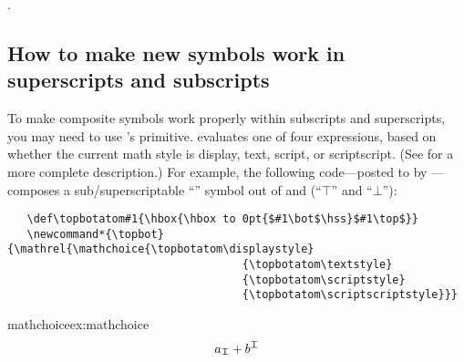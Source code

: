 \ifhavecenternot
\else
  .
\fi   
{}


\subsection{How to make new symbols work in superscripts and subscripts}



To make composite symbols work properly within subscripts and
superscripts, you may need to use \tex's \cmd{\mathchoice} primitive.
\cmd{\mathchoice} evaluates one of four expressions, based on whether
the current math style is display, text, script, or scriptscript.
(See \TeXbook for a more complete description.)  For example, the
following \latex code---posted to \ctt by
---composes a sub/superscriptable
``\cmd{\topbot}'' symbol out of  and  (``$\top$''
and ``$\bot$''):



\indexcommand{\displaystyle}%
\indexcommand{\textstyle}%
\indexcommand{\scriptstyle}%
\indexcommand{\scriptscriptstyle}%
\label{code:topbot}%

\begin{verbatim}
   \def\topbotatom#1{\hbox{\hbox to 0pt{$#1\bot$\hss}$#1\top$}}
   \newcommand*{\topbot}{\mathrel{\mathchoice{\topbotatom\displaystyle}
                                    {\topbotatom\textstyle}
                                    {\topbotatom\scriptstyle}
                                    {\topbotatom\scriptscriptstyle}}}
\end{verbatim}

\begin{texexample}{mathchoice}{ex:mathchoice}
\bgroup
\def\topbotatom#1{\hbox{\hbox to 0pt{$#1\bot$\hss}$#1\top$}}
   \def\topbot{\mathrel{\mathchoice{\topbotatom\displaystyle}
                                    {\topbotatom\textstyle}
                                    {\topbotatom\scriptstyle}
                                    {\topbotatom\scriptscriptstyle}}}
\[ a_{\topbot} + b^{\topbot} \]
\egroup
\end{texexample}


